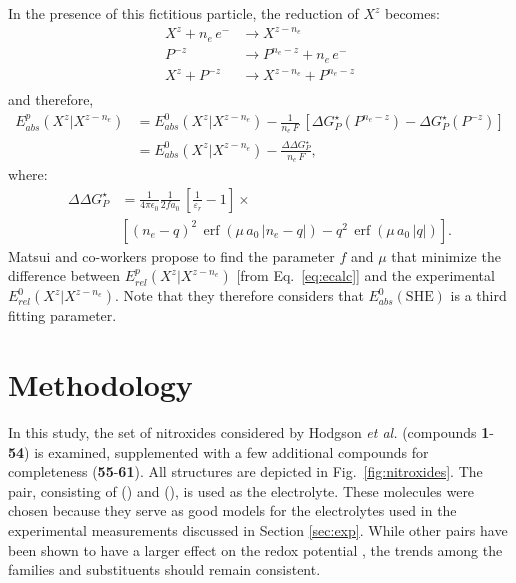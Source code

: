 \documentclass[review,preprint]{elsarticle}
\DeclareMathOperator{\erf}{erf}
\begin{document}
In the presence of this fictitious particle, the reduction of $X^z$ becomes:\begin{equation*}
	\begin{array}{rl}
		X^z + n_e\,e^- &\rightarrow X^{z-n_e} \\
		P^{-z} \phantom{ + n_e\,e^-} &\rightarrow P^{n_e-z} + n_e\,e^- \\
		\hline
		X^z + P^{-z}&\rightarrow X^{z-n_e} +P^{n_e-z}\\
	\end{array}  \label{eq:corr}
\end{equation*}
and therefore,\begin{align}
	E^p_{abs}(X^z|X^{z-n_e}) &= 	E_{abs}^0(X^{z}|X^{z-n_e}) -\frac{1}{n_e\,F}\,[\Delta G^\star_{P}(P^{n_e-z}) - \Delta G^\star_{P}(P^{-z})] \nonumber\\
	&= 	E_{abs}^0(X^{z}|X^{z-n_e}) -\frac{\Delta\Delta G^\star_P}{n_e\,F}, \label{eq:matsui} 
\end{align}
where:\begin{align*}
	\Delta\Delta G^\star_P&=\frac{1}{4\pi\epsilon_0}\frac{1}{2fa_0}\,\left[\frac{1}{\varepsilon_r}-1\right]\times\nonumber\\
	&\left[ (n_e-q)^2\,\erf(\mu\,a_0\,|n_e-q|)-q^2\,\erf(\mu\,a_0\,|q|)\right].
\end{align*}
Matsui and co-workers propose to  find the parameter $f$ and $\mu$ that minimize the difference between $E^p_{rel}(X^z|X^{z-n_e})$  [from Eq.~\eqref{eq:ecalc}] and the experimental $E^0_{rel}(X^z|X^{z-n_e})$.  Note that they therefore considers that $ E^{0}_{abs}(\text{SHE})$ is a third fitting parameter.

\clearpage
\section{Methodology} \label{sec:methodo}

In this study, the set of nitroxides considered by Hodgson \textit{et al.} (compounds \textbf{1}-\textbf{54}) is examined, supplemented with a few additional compounds for completeness (\textbf{55}-\textbf{61}). All structures are depicted in Fig.~\ref{fig:nitroxides}. The  pair, consisting of  () and  (), is used as the electrolyte. These molecules were chosen because they serve as good models for the electrolytes used in the experimental measurements discussed in Section \ref{sec:exp}. While other pairs have been shown to have a larger effect on the redox potential \cite{wylieImprovedPerformanceAllOrganic2019a}, the trends among the families and substituents should remain consistent.
\end{document}
